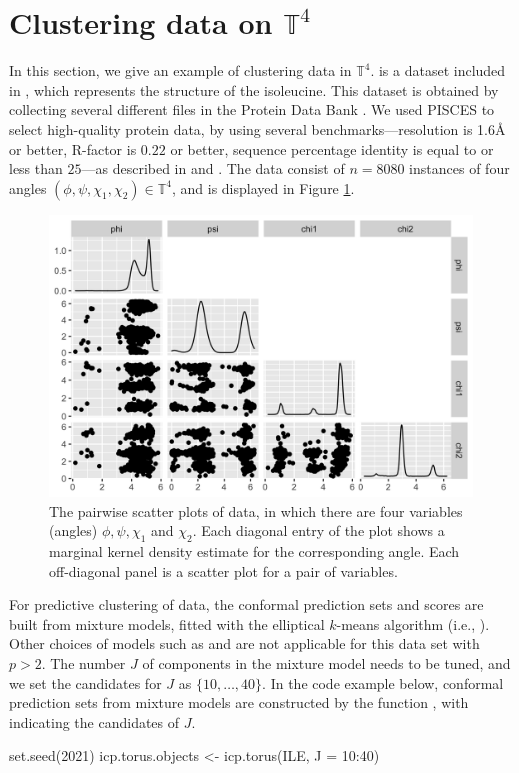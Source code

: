 \section{Clustering data on $\mathbb{T}^4$}

In this section, we give an example of clustering  data in $\mathbb{T}^4$.  is a dataset included in , which represents the structure of the isoleucine. This dataset is obtained by collecting several different  files in the Protein Data Bank \citep{pdb}. We used PISCES \citep{pisces} to select high-quality protein data, by using several benchmarks---resolution is 1.6\AA$~$or better, R-factor is $0.22$ or better, sequence percentage identity is equal to or less than $25$---as described in \citet{Tim:2010} and \citet{Mardia:2012}. %
The  data consist of $n = 8080$ instances of four angles $(\phi, \psi, \chi_1,\chi_2) \in \mathbb{T}^4$, and is displayed in Figure \ref{fig:ile}. 

\begin{figure}
     \centering
     \includegraphics[scale = 0.2]{ILE.png}
     \caption{The pairwise scatter plots of  data, in which there are four variables (angles) $\phi,\psi,\chi_1$ and $\chi_2$. Each diagonal entry of the plot shows a marginal kernel density estimate for the corresponding angle. Each off-diagonal panel is a scatter plot for a pair of variables.}
     \label{fig:ile}
\end{figure}

For predictive clustering of  data, the conformal prediction sets and scores are built from mixture models, fitted with the elliptical $k$-means algorithm (i.e., ). Other choices of models such as  and  are not applicable for this data set with $p > 2$.
The number $J$ of components in the mixture model needs to be tuned, and we set the candidates for $J$ as $\{10,\ldots, 40\}$. In the code example below,  conformal prediction sets from mixture models are constructed  by the function , with  indicating the candidates of $J$.  
\begin{example}
set.seed(2021)
icp.torus.objects <- icp.torus(ILE, J = 10:40)
\end{example}

